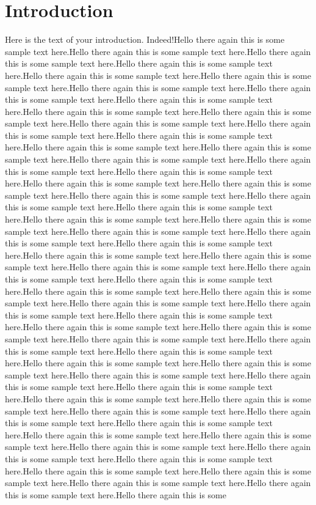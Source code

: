 \documentclass{article}
\begin{document}
\section{Introduction}
Here is the text of your introduction. Indeed!Hello there again this is some sample text here.Hello there again this is some sample text here.Hello there again this is some sample text here.Hello there again this is some sample text here.Hello there again this is some sample text here.Hello there again this is some sample text here.Hello there again this is some sample text here.Hello there again this is some sample text here.Hello there again this is some sample text here.Hello there again this is some sample text here.Hello there again this is some sample text here.Hello there again this is some sample text here.Hello there again this is some sample text here.Hello there again this is some sample text here.Hello there again this is some sample text here.Hello there again this is some sample text here.Hello there again this is some sample text here.Hello there again this is some sample text here.Hello there again this is some sample text here.Hello there again this is some sample text here.Hello there again this is some sample text here.Hello there again this is some sample text here.Hello there again this is some sample text here.Hello there again this is some sample text here.Hello there again this is some sample text here.Hello there again this is some sample text here.Hello there again this is some sample text here.Hello there again this is some sample text here.Hello there again this is some sample text here.Hello there again this is some sample text here.Hello there again this is some sample text here.Hello there again this is some sample text here.Hello there again this is some sample text here.Hello there again this is some sample text here.Hello there again this is some sample text here.Hello there again this is some sample text here.Hello there again this is some sample text here.Hello there again this is some sample text here.Hello there again this is some sample text here.Hello there again this is some sample text here.Hello there again this is some sample text here.Hello there again this is some sample text here.Hello there again this is some sample text here.Hello there again this is some sample text here.Hello there again this is some sample text here.Hello there again this is some sample text here.Hello there again this is some sample text here.Hello there again this is some sample text here.Hello there again this is some sample text here.Hello there again this is some sample text here.Hello there again this is some sample text here.Hello there again this is some sample text here.Hello there again this is some sample text here.Hello there again this is some sample text here.Hello there again this is some sample text here.Hello there again this is some sample text here.Hello there again this is some sample text here.Hello there again this is some sample text here.Hello there again this is some sample text here.Hello there again this is some sample text here.Hello there again this is some sample text here.Hello there again this is some sample text here.Hello there again this is some sample text here.Hello there again this is some 
\end{document}
